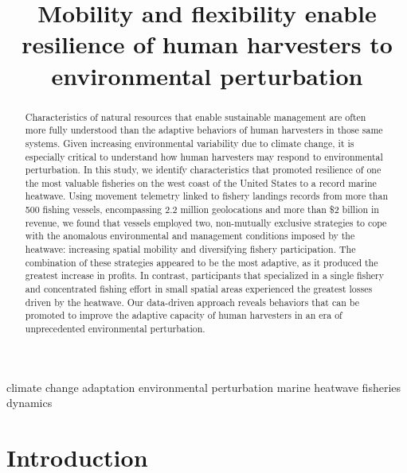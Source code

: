 \documentclass[]{elsarticle} %
\begin{document}
\begin{frontmatter}

  \title{Mobility and flexibility enable resilience of human harvesters to
environmental perturbation}
      
  \begin{abstract}
  Characteristics of natural resources that enable sustainable management
  are often more fully understood than the adaptive behaviors of human
  harvesters in those same systems. Given increasing environmental
  variability due to climate change, it is especially critical to
  understand how human harvesters may respond to environmental
  perturbation. In this study, we identify characteristics that promoted
  resilience of one the most valuable fisheries on the west coast of the
  United States to a record marine heatwave. Using movement telemetry
  linked to fishery landings records from more than 500 fishing vessels,
  encompassing 2.2 million geolocations and more than \$2 billion in
  revenue, we found that vessels employed two, non-mutually exclusive
  strategies to cope with the anomalous environmental and management
  conditions imposed by the heatwave: increasing spatial mobility and
  diversifying fishery participation. The combination of these strategies
  appeared to be the most adaptive, as it produced the greatest increase
  in profits. In contrast, participants that specialized in a single
  fishery and concentrated fishing effort in small spatial areas
  experienced the greatest losses driven by the heatwave. Our data-driven
  approach reveals behaviors that can be promoted to improve the adaptive
  capacity of human harvesters in an era of unprecedented environmental
  perturbation.
  \end{abstract}
   \begin{keyword} climate change adaptation \textbar{} environmental perturbation
\textbar{} marine heatwave \textbar{} fisheries dynamics\end{keyword}
 \end{frontmatter}

\hypertarget{intro}{%
\section{Introduction}\label{intro}}
\end{document}
